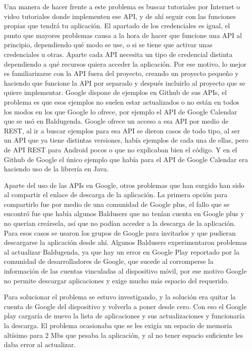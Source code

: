 Una manera de hacer frente a este problema es buscar tutoriales por Internet o video tutoriales donde implementen ese API, y de ahí seguir con las funciones propias que tendrá tu aplicación.
El apartado de los credenciales es igual, el punto que mayores problemas causa a la hora de hacer que funcione una API al principio, dependiendo qué modo se use, o si se tiene que activar unas credenciales u otras. Aparte cada API necesita un tipo de credencial distinta dependiendo a qué recursos quiera acceder la aplicación.
Por ese motivo, lo mejor es familiarizarse con la API fuera del proyecto, creando un proyecto pequeño y haciendo que funcione la API por separado y después incluirlo al proyecto que se quiere implementar.
Google dispone de ejemplos en Github de sus APIs, el problema es que esos ejemplos no suelen estar actualizados o no están en todos los modos en los que Google lo ofrece, por ejemplo el API de Google Calendar que se usó en Baldugenda. Google ofrece un acceso a esa API por medio de REST, al ir a buscar ejemplos para esa API se dieron casos de todo tipo, al ser un API que ya tiene distintas versiones, había ejemplos de cada una de ellas, pero de API REST para Android pocos o que no explicaban bien el código. Y en el Github de Google el único ejemplo que había para el API de Google Calendar era haciendo uso de la librería en Java.

Aparte del uso de las APIs en Google, otros problemas que han surgido han sido al compartir el enlace de descarga de la aplicación.
La primera opción para compartirlo fue por medio de una comunidad de Google plus,  el fallo que se encontró fue que había algunos Baldusers que no tenían cuenta en Google plus y no querían creársela, así que no podían acceder a la descarga de la aplicación.
Para esos casos se usaron los grupos de Google para invitarlos y que pudieran descargarse la aplicación desde ahí.
Algunos Baldusers experimentaron problemas al actualizar Baldugenda, ya que hay un error en Google Play reportado por la comunidad de desarrolladores de Google, que sucede al corromperse la información de las cuentas vinculadas al dispositivo móvil, por ese motivo Google no permite descargar aplicaciones y exige mucho más espacio del requerido.

Para solucionar el problema se estuvo investigando, y la solución era quitar la cuenta de Google del dispositivo y volverla a poner desde cero.
Con eso el Google play cargaría de nuevo la lista de aplicaciones y sus actualizaciones y funcionaría la descarga.
El problema ocasionaba que se les exigía un espacio de memoria altísimo para 2 Mbs que pesaba la aplicación, y al no tener espacio suficiente les daba error al actualizar.


